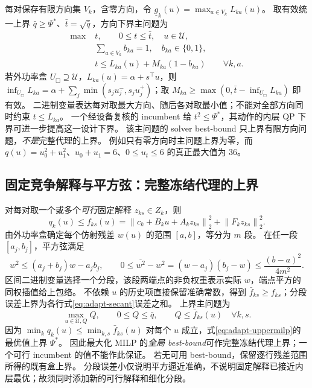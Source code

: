 \documentclass[UTF8,fontset=fandol,11pt,a4paper]{ctexart}
\newcommand{\norm}[1]{\left\lVert#1\right\rVert}
\begin{document}
每对保存有限方向集 $V_k$，含零方向，令 $\underline g_k(u)=\max_{a\in V_k}L_{ka}(u)$。
取有效统一上界 $\bar q\ge\Psi^*$、$\bar t=\sqrt{\bar q}$，方向下界主问题为
\begin{equation}
 \begin{aligned}
  \max\;&t,\qquad 0\le t\le\bar t,\quad u\in\mathcal U,\\
  &\sum_{a\in V_k}b_{ka}=1,\quad b_{ka}\in\{0,1\},\\
  &t\le L_{ka}(u)+M_{ka}(1-b_{ka})\qquad\forall k,a .
 \end{aligned}
 \label{eq:adapt-lowermilp}
\end{equation}
若外功率盒 $U_\Box\supseteq\mathcal U$，$L_{ka}(u)=\alpha+s^\top u$，则
$\inf_{U_\Box}L_{ka}=\alpha+\sum_j\min(s_ju_j^-,s_ju_j^+)$；取 $M_{ka}\ge\max(0,\bar t-\inf_{U_\Box}L_{ka})$ 即有效。
二进制变量表达每对取最大方向、随后各对取最小值；不能对全部方向同时约束 $t\le L_{ka}$。
一个经设备复核的 incumbent 给 $t^2\le\Psi^*$，其动作的内层 QP 下界可进一步提高这一设计下界。
该主问题的 solver best-bound 只上界有限方向问题，\emph{不是}完整代理的上界。
例如只有零方向时主问题上界为零，而 $q(u)=u_0^2+u_1^2$、$u_0+u_1=6$、$0\le u_t\le6$ 的真正最大值为 $36$。

\subsection{固定竞争解释与平方弦：完整冻结代理的上界}
对每对取一个或多个\emph{可行}固定解释 $z_{ks}\in Z_k$，则
\begin{equation}
 q_k(u)\le f_{ks}(u)
 =\norm{c_k+B_ku+A_kz_{ks}}_2^2+\norm{F_kz_{ks}}_2^2 .
 \label{eq:adapt-witness}
\end{equation}
由外功率盒确定每个仿射残差 $w(u)$ 的范围 $[a,b]$，等分为 $m$ 段。
在任一段 $[a_j,b_j]$，平方弦满足
\begin{equation}
 w^2\le(a_j+b_j)w-a_jb_j,\qquad
 0\le\overline{w^2}-w^2=(w-a_j)(b_j-w)
 \le\frac{(b-a)^2}{4m^2}.
 \label{eq:adapt-secant}
\end{equation}
区间二进制变量选择一个分段，该段两端点的非负权重表示实际 $w$，端点平方的同权插值给上包络。
不依赖 $u$ 的历史项直接保留准确常数，得到 $\bar f_{ks}\ge f_{ks}$；分段误差上界为各行式\eqref{eq:adapt-secant}误差之和。
上界主问题为
\begin{equation}
 \max_{u\in\mathcal U,Q}Q,\qquad
 0\le Q\le\bar q,\qquad Q\le\bar f_{ks}(u)\quad\forall k,s .
 \label{eq:adapt-uppermilp}
\end{equation}
因为 $\min_kq_k(u)\le\min_{k,s}\bar f_{ks}(u)$ 对每个 $u$ 成立，式\eqref{eq:adapt-uppermilp}的最优值上界 $\Psi^*$。
因此最大化 MILP 的\emph{全局 best-bound}可作完整冻结代理上界；一个可行 incumbent 的值不能作此保证。
若无可用 best-bound，保留逐行残差范围所得的既有盒上界。
分段误差小仅说明平方逼近准确，不说明固定解释已接近内层最优；故须同时添加新的可行解释和细化分段。
\end{document}
